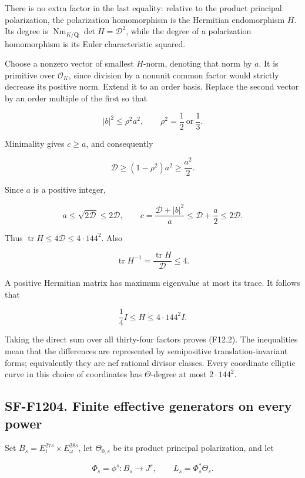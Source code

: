 There is no extra factor in the last equality: relative to the product
principal polarization, the polarization homomorphism is the Hermitian
endomorphism \(H\). Its degree is
\(\operatorname{Nm}_{K/\mathbf Q}\det H=\mathcal D^2\), while the degree
of a polarization homomorphism is its Euler characteristic squared.

Choose a nonzero vector of smallest \(H\)-norm, denoting that norm by
\(a\). It is primitive over \(\mathcal O_K\), since division by a
nonunit common factor would strictly decrease its positive norm. Extend
it to an order basis. Replace the second vector by an order multiple of
the first so that

\[
 |b|^2\le\rho^2a^2,\qquad
 \rho^2=\frac12\ \text{or}\ \frac13.
\]

Minimality gives \(c\ge a\), and consequently

\[
 \mathcal D\ge(1-\rho^2)a^2\ge\frac{a^2}{2}.
\]

Since \(a\) is a positive integer,

\[
 a\le\sqrt{2\mathcal D}\le2\mathcal D,\qquad
 c=\frac{\mathcal D+|b|^2}{a}
    \le\mathcal D+\frac a2\le2\mathcal D.
 \tag{F12.12}
\]

Thus \(\operatorname{tr}H\le4\mathcal D\le4\cdot144^2\). Also

\[
 \operatorname{tr}H^{-1}
   =\frac{\operatorname{tr}H}{\mathcal D}\le4.
\]

A positive Hermitian matrix has maximum eigenvalue at most its trace. It
follows that

\[
 \frac14I\le H\le4\cdot144^2I.
 \tag{F12.13}
\]

Taking the direct sum over all thirty-four factors proves (F12.2). The
inequalities mean that the differences are represented by semipositive
translation-invariant forms; equivalently they are nef rational divisor
classes. Every coordinate elliptic curve in this choice of coordinates
has \(\Theta\)-degree at most \(2\cdot144^2\).

\subsection{SF-F1204. Finite effective generators on every
power}\label{SF-F1204}

Set \(B_s=E_i^{27s}\times E_\omega^{28s}\), let \(\Theta_{0,s}\) be its
product principal polarization, and let

\[
 \Phi_s=\phi^s:B_s\longrightarrow J^s,\qquad
 L_s=\Phi_s^*\Theta_s.
\]

